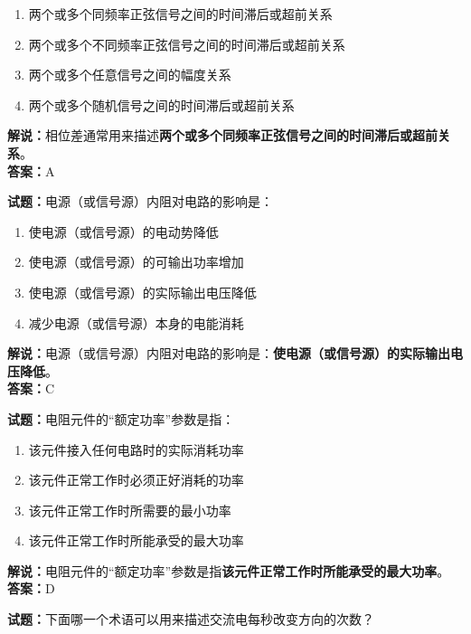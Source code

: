 \documentclass{ctexbook}
\begin{document}
\begin{enumerate}[leftmargin=3em]
	\item 两个或多个同频率正弦信号之间的时间滞后或超前关系
	\item 两个或多个不同频率正弦信号之间的时间滞后或超前关系
	\item 两个或多个任意信号之间的幅度关系
	\item 两个或多个随机信号之间的时间滞后或超前关系
\end{enumerate}

\noindent\textbf{解说：}相位差通常用来描述\textbf{两个或多个同频率正弦信号之间的时间滞后或超前关系}。\\\noindent\textbf{答案：}A


\bigskip


\noindent\textbf{试题：}电源（或信号源）内阻对电路的影响是：

\begin{enumerate}[leftmargin=3em]
	\item 使电源（或信号源）的电动势降低
	\item 使电源（或信号源）的可输出功率增加
	\item 使电源（或信号源）的实际输出电压降低
	\item 减少电源（或信号源）本身的电能消耗
\end{enumerate}

\noindent\textbf{解说：}电源（或信号源）内阻对电路的影响是：\textbf{使电源（或信号源）的实际输出电压降低}。\\\noindent\textbf{答案：}C


\bigskip


\noindent\textbf{试题：}电阻元件的“额定功率”参数是指：

\begin{enumerate}[leftmargin=3em]
	\item 该元件接入任何电路时的实际消耗功率
	\item 该元件正常工作时必须正好消耗的功率
	\item 该元件正常工作时所需要的最小功率
	\item 该元件正常工作时所能承受的最大功率
\end{enumerate}

\noindent\textbf{解说：}电阻元件的“额定功率”参数是指\textbf{该元件正常工作时所能承受的最大功率}。\\\noindent\textbf{答案：}D



\bigskip


\noindent\textbf{试题：}下面哪一个术语可以用来描述交流电每秒改变方向的次数？
\end{document}
